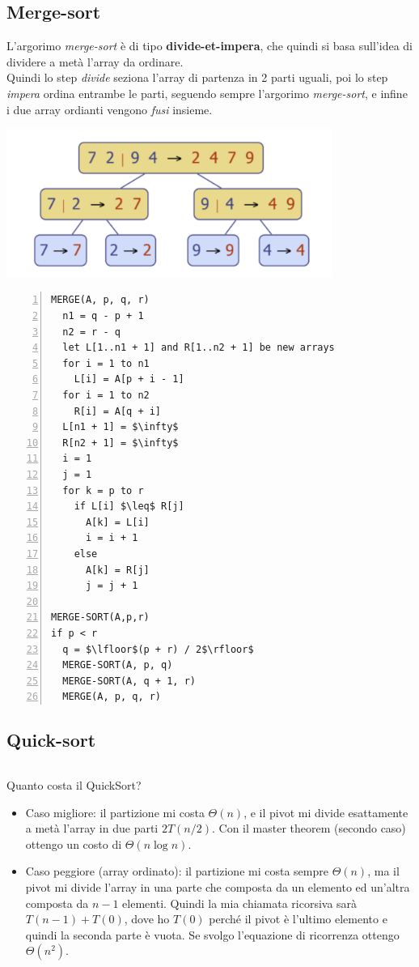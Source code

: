 \documentclass{article}
\begin{document}
\subsection{Merge-sort}
L'argorimo \emph{merge-sort} è di tipo \textbf{divide-et-impera}, che quindi si basa sull'idea di dividere a metà l'array da ordinare. \\
Quindi lo step \emph{divide} seziona l'array di partenza in 2 parti uguali, poi lo step \emph{impera} ordina entrambe le parti, seguendo sempre l'argorimo \emph{merge-sort}, e infine i due array ordianti vengono \emph{fusi} insieme.
\begin{center}
  \includegraphics[width=0.8\textwidth]{merge_sort.png}
\end{center}
\begin{lstlisting}[mathescape, numbers=left]
MERGE(A, p, q, r)
  n1 = q - p + 1
  n2 = r - q
  let L[1..n1 + 1] and R[1..n2 + 1] be new arrays
  for i = 1 to n1
    L[i] = A[p + i - 1]
  for i = 1 to n2
    R[i] = A[q + i]
  L[n1 + 1] = $\infty$
  R[n2 + 1] = $\infty$
  i = 1
  j = 1
  for k = p to r
    if L[i] $\leq$ R[j]
      A[k] = L[i]
      i = i + 1
    else
      A[k] = R[j]
      j = j + 1

MERGE-SORT(A,p,r)
if p < r
  q = $\lfloor$(p + r) / 2$\rfloor$
  MERGE-SORT(A, p, q)
  MERGE-SORT(A, q + 1, r)
  MERGE(A, p, q, r)
\end{lstlisting}
\subsection{Quick-sort}
\begin{lstlisting}[numbers=left]

\end{lstlisting}
Quanto costa il QuickSort?
\begin{itemize}
  \item Caso migliore: il partizione mi costa \(\Theta(n)\), e il pivot mi divide esattamente a metà l'array in due parti \(2T(n/2)\). Con il master theorem (secondo caso) ottengo un costo di \(\Theta(n \log n)\).
  \item Caso peggiore (array ordinato): il partizione mi costa sempre \(\Theta(n)\), ma il pivot mi divide l'array in una parte che composta da un elemento ed un'altra composta da \(n-1\) elementi. Quindi la mia chiamata ricorsiva sarà \(
        T(n-1) + T(0)\), dove ho \(T(0)\) perché il pivot è l'ultimo elemento e quindi la seconda parte è vuota. Se svolgo l'equazione di ricorrenza ottengo \(\Theta(n^2)\).
\end{itemize}
\end{document}
